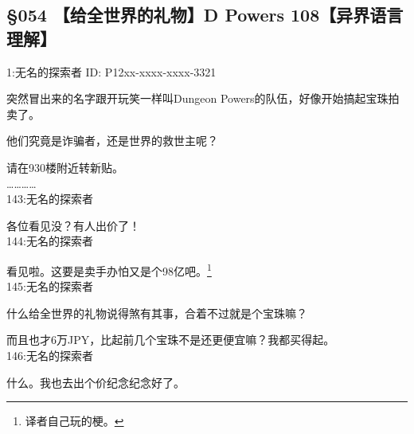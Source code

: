 \subsection{§054 【给全世界的礼物】D Powers 108【异界语言理解】}

1:无名的探索者 ID: P12xx-xxxx-xxxx-3321

突然冒出来的名字跟开玩笑一样叫Dungeon Powers的队伍，好像开始搞起宝珠拍卖了。

他们究竟是诈骗者，还是世界的救世主呢？

请在930楼附近转新贴。\\

…………\\

143:无名的探索者

各位看见没？有人出价了！\\

144:无名的探索者

看见啦。这要是卖手办怕又是个98亿吧。\footnote{译者自己玩的梗。}\\

145:无名的探索者

什么给全世界的礼物说得煞有其事，合着不过就是个宝珠嘛？

而且也才6万JPY，比起前几个宝珠不是还更便宜嘛？我都买得起。\\

146:无名的探索者

什么。我也去出个价纪念纪念好了。\\

